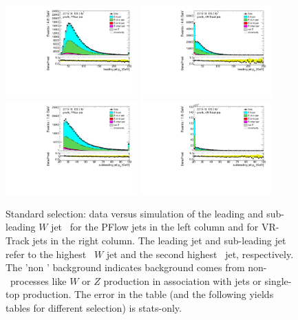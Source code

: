 \begin{figure}[bth]
	\centering
	\includegraphics[width=0.45\textwidth]{FTAG_plots/pretagNoRwwithouthighpTPFlowall/DataMC_h_J0_pt.pdf}
	\includegraphics[width=0.45\textwidth]{FTAG_plots/pretagNoRwwithouthighpTVRJetsall/DataMC_h_J0_pttrackjet.pdf}\\
	\includegraphics[width=0.45\textwidth]{FTAG_plots/pretagNoRwwithouthighpTPFlowall/DataMC_h_J1_pt.pdf}
	\includegraphics[width=0.45\textwidth]{FTAG_plots/pretagNoRwwithouthighpTVRJetsall/DataMC_h_J1_pttrackjet.pdf}\\
	\caption{Standard selection: data versus simulation of the leading and sub-leading $W$ jet \pt\ 
	for the PFlow jets in the left column and for VR-Track jets in the right column. 
	The leading jet and sub-leading jet refer to the highest \pt\ $W$ jet and the 
	second highest \pt\ jet, respectively. The 'non \ttbar' background 
	indicates background comes from non-\ttbar\ processes like $W$ or $Z$ production
	in association with jets or single-top production.
	The error in the table (and the following yields tables for
	different selection) is stats-only. }
	\label{fig:kinematic_distributions_standard}
\end{figure}
